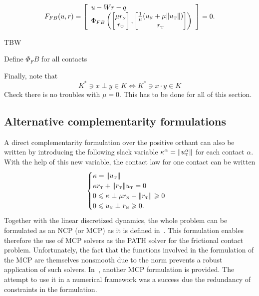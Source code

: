 \begin{equation}
  \label{eq:FB-II}
   F_{FB}(u,r) =   \left[
     \begin{array}{l} 
       u - W r -q\\
       \Phi_{FB}\left(
       \begin{bmatrix}
         \mu r_\n \\
         r_\t
       \end{bmatrix},
       \begin{bmatrix}
         \frac 1 \mu (u_\n+ \mu \|u_\t\|)\\
         r_\t
       \end{bmatrix}
       \right)
     \end{array}\right] 
   = 0.
\end{equation}
\begin{ndrva}
  TBW
  
  Define $\Phi_FB$ for all contacts
  
  Finally, note that
  \begin{equation}
    \label{eq:equiv}
    K^* \ni x \perp y \in K \Longleftrightarrow K^* \ni x \cdot y \in K
  \end{equation}
  Check there is no troubles with $\mu =0$. This has to be done for all of this section.
\end{ndrva}


\subsection{Alternative  complementarity formulations}

A direct complementarity formulation over the positive orthant can also be written by introducing the following slack variable  $\kappa^\alpha = \|u^\alpha_{{\hbox{\tiny{T}}}}\|$ for each contact $\alpha$. With the help of this new variable, the contact law for one contact can be written
\begin{equation}
  \label{eq:MCP}
  \begin{cases}
    \kappa = \|u_{\t}\| \\
    \kappa r_\t + \|r_\t\| u_\t =0\\
    0 \leq \kappa \perp \mu r_\n - \|r_\t\| \geq 0 \\
    0 \leq u_\n \perp r_\n \geq 0.
  \end{cases}
\end{equation}
Together with the linear discretized dynamics, the whole problem can be formulated as an NCP (or MCP) as it is defined in~\cite{Dirkse.Ferris1995}. This formulation enables therefore the use of MCP solvers as the PATH solver for the frictional contact problem. Unfortunately, the fact that the functions involved in the formulation of the MCP are themselves nonsmooth due to the norm prevents a robust application of such solvers. In~\cite{Glocker1999}, another MCP formulation is provided. The attempt to use it in a numerical framework was a success due the redundancy of constraints in the formulation.


